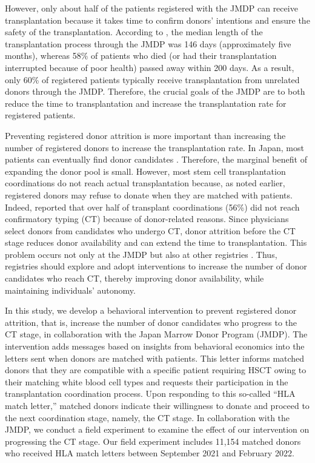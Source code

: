 \documentclass[12pt, a4paper]{article}
\begin{document}
However, only about half of the patients registered with the JMDP can receive transplantation because it takes time to confirm donors' intentions and ensure the safety of the transplantation. According to \citet{Hirakawa2018}, the median length of the transplantation process through the JMDP was 146 days (approximately five months), whereas 58\% of patients who died (or had their transplantation interrupted because of poor health) passed away within 200 days. As a result, only 60\% of registered patients typically receive transplantation from unrelated donors through the JMDP. Therefore, the crucial goals of the JMDP are to both reduce the time to transplantation and increase the transplantation rate for registered patients.

Preventing registered donor attrition is more important than increasing the number of registered donors to increase the transplantation rate. In Japan, most patients can eventually find donor candidates \citep{Takanashi2016}. Therefore, the marginal benefit of expanding the donor pool is small. However, most stem cell transplantation coordinations do not reach actual transplantation because, as noted earlier, registered donors may refuse to donate when they are matched with patients. Indeed, \citet{Hirakawa2018} reported that over half of transplant coordinations (56\%) did not reach confirmatory typing (CT) because of donor-related reasons. Since physicians select donors from candidates who undergo CT, donor attrition before the CT stage reduces donor availability and can extend the time to transplantation. This problem occurs not only at the JMDP but also at other registries \citep[for example,][]{Balassa2019, Hamed2023, Haylock2024}. Thus, registries should explore and adopt interventions to increase the number of donor candidates who reach CT, thereby improving donor availability, while maintaining individuals' autonomy.

In this study, we develop a behavioral intervention to prevent registered donor attrition, that is, increase the number of donor candidates who progress to the CT stage, in collaboration with the Japan Marrow Donor Program (JMDP). The intervention adds messages based on insights from behavioral economics into the letters sent when donors are matched with patients. This letter informs matched donors that they are compatible with a specific patient requiring HSCT owing to their matching white blood cell types and requests their participation in the transplantation coordination process. Upon responding to this so-called ``HLA match letter,'' matched donors indicate their willingness to donate and proceed to the next coordination stage, namely, the CT stage. In collaboration with the JMDP, we conduct a field experiment to examine the effect of our intervention on progressing the CT stage. Our field experiment includes 11,154 matched donors who received HLA match letters between September 2021 and February 2022.
\end{document}
